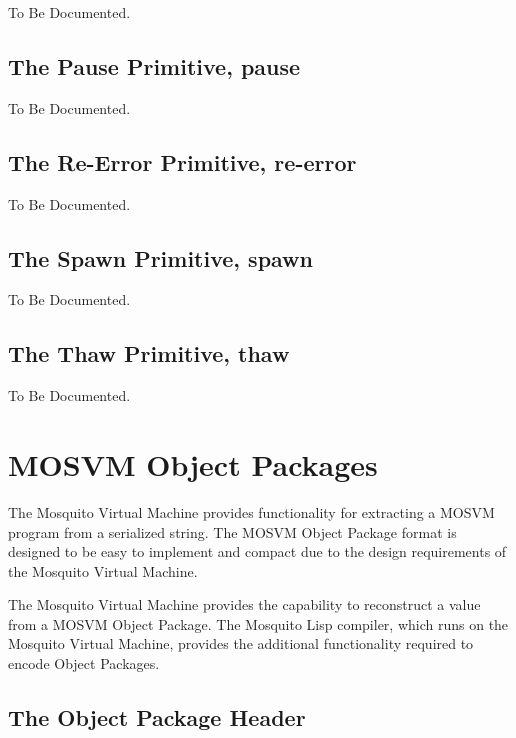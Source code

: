 \documentclass[notitlepage,oneside]{book}
\begin{document}
To Be Documented.

\section{The Pause Primitive, pause}
\label{p-pause}

To Be Documented.

\section{The Re-Error Primitive, re-error}
\label{p-re-error}

To Be Documented.

\section{The Spawn Primitive, spawn}
\label{p-spawn}

To Be Documented.

\section{The Thaw Primitive, thaw}
\label{p-thaw}

To Be Documented.

\chapter{MOSVM Object Packages}
\label{serialization}

The Mosquito Virtual Machine provides functionality for extracting a MOSVM program from a serialized string.  The MOSVM Object Package format is designed to be easy to implement and compact due to the design requirements of the Mosquito Virtual Machine.

The Mosquito Virtual Machine provides the capability to reconstruct a value from a MOSVM Object Package.  The Mosquito Lisp compiler, which runs on the Mosquito Virtual Machine, provides the additional functionality required to encode Object Packages.

\section{The Object Package Header}
\label{package-header}
\end{document}
